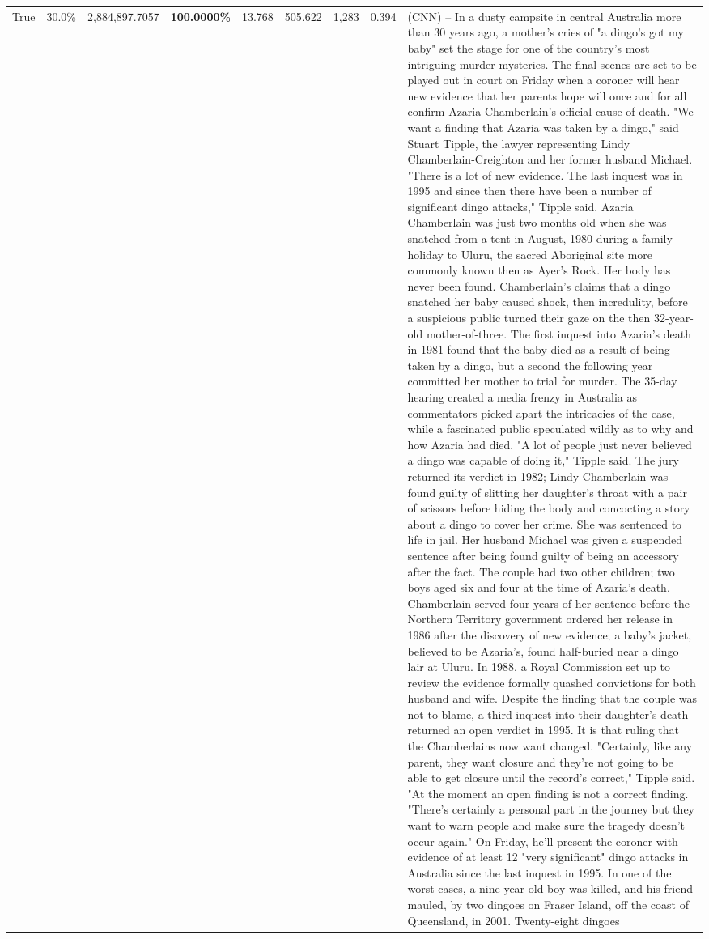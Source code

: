 \begin{table}[H]
\begin{tabular}{lllrlllll}
True & 30.0\% & 2,884,897.7057 & \bfseries \color{red} 100.0000\% & 13.768 & 505.622 & 1,283 & 0.394 & (CNN) -- In a dusty campsite in central Australia more than 30 years ago, a mother's cries of "a dingo's got my baby" set the stage for one of the country's most intriguing murder mysteries. The final scenes are set to be played out in court on Friday when a coroner will hear new evidence that her parents hope will once and for all confirm Azaria Chamberlain's official cause of death. "We want a finding that Azaria was taken by a dingo," said Stuart Tipple, the lawyer representing Lindy Chamberlain-Creighton and her former husband Michael. "There is a lot of new evidence. The last inquest was in 1995 and since then there have been a number of significant dingo attacks," Tipple said. Azaria Chamberlain was just two months old when she was snatched from a tent in August, 1980 during a family holiday to Uluru, the sacred Aboriginal site more commonly known then as Ayer's Rock. Her body has never been found. Chamberlain's claims that a dingo snatched her baby caused shock, then incredulity, before a suspicious public turned their gaze on the then 32-year-old mother-of-three. The first inquest into Azaria's death in 1981 found that the baby died as a result of being taken by a dingo, but a second the following year committed her mother to trial for murder. The 35-day hearing created a media frenzy in Australia as commentators picked apart the intricacies of the case, while a fascinated public speculated wildly as to why and how Azaria had died. "A lot of people just never believed a dingo was capable of doing it," Tipple said. The jury returned its verdict in 1982; Lindy Chamberlain was found guilty of slitting her daughter's throat with a pair of scissors before hiding the body and concocting a story about a dingo to cover her crime. She was sentenced to life in jail. Her husband Michael was given a suspended sentence after being found guilty of being an accessory after the fact. The couple had two other children; two boys aged six and four at the time of Azaria's death. Chamberlain served four years of her sentence before the Northern Territory government ordered her release in 1986 after the discovery of new evidence; a baby's jacket, believed to be Azaria's, found half-buried near a dingo lair at Uluru. In 1988, a Royal Commission set up to review the evidence formally quashed convictions for both husband and wife. Despite the finding that the couple was not to blame, a third inquest into their daughter's death returned an open verdict in 1995. It is that ruling that the Chamberlains now want changed. "Certainly, like any parent, they want closure and they're not going to be able to get closure until the record's correct," Tipple said. "At the moment an open finding is not a correct finding. "There's certainly a personal part in the journey but they want to warn people and make sure the tragedy doesn't occur again." On Friday, he'll present the coroner with evidence of at least 12 "very significant" dingo attacks in Australia since the last inquest in 1995. In one of the worst cases, a nine-year-old boy was killed, and his friend mauled, by two dingoes on Fraser Island, off the coast of Queensland, in 2001. Twenty-eight dingoes 
\end{tabular}
\end{table}

